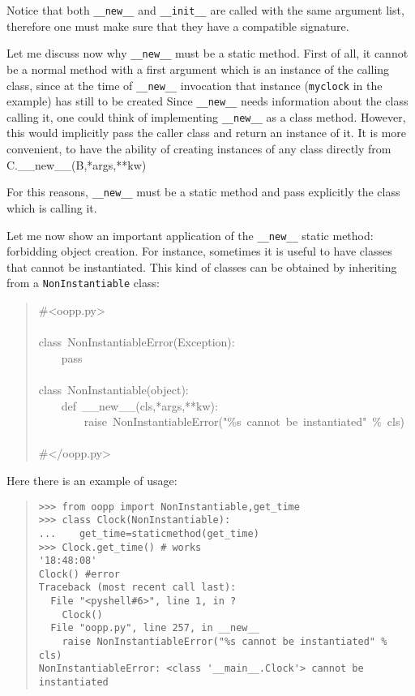 \documentclass[10pt,english]{article}
\begin{document}
Notice that both \texttt{{\_}{\_}new{\_}{\_}} and \texttt{{\_}{\_}init{\_}{\_}} are called with the same 
argument list, therefore one must make sure that they have a compatible 
signature.

Let me discuss now why \texttt{{\_}{\_}new{\_}{\_}} must be a static method.
First of all, it cannot be a normal method with a first argument which is an
instance of the calling class, since at the time of \texttt{{\_}{\_}new{\_}{\_}} invocation
that instance (\texttt{myclock} in the example) has still to be created
Since \texttt{{\_}{\_}new{\_}{\_}} needs information about the class calling it, one
could think of implementing \texttt{{\_}{\_}new{\_}{\_}} as a class method. However,
this would implicitly pass the caller class and return an instance
of it. It is more convenient, to have the ability of creating
instances of any class directly from C.{\_}{\_}new{\_}{\_}(B,*args,**kw)

For this reasons, \texttt{{\_}{\_}new{\_}{\_}} must be a static method and pass explicitly
the class which is calling it.

Let me now show an important application of the \texttt{{\_}{\_}new{\_}{\_}} static method:
forbidding object creation. For instance, sometimes it is useful to have 
classes that cannot be instantiated. This kind of classes can be
obtained by inheriting from a \texttt{NonInstantiable} class:
\begin{quote}
\begin{ttfamily}\begin{flushleft}
\mbox{{\#}<oopp.py>}\\
\mbox{}\\
\mbox{class~NonInstantiableError(Exception):~}\\
\mbox{~~~~pass}\\
\mbox{}\\
\mbox{class~NonInstantiable(object):~}\\
\mbox{~~~~def~{\_}{\_}new{\_}{\_}(cls,*args,**kw):}\\
\mbox{~~~~~~~~raise~NonInstantiableError("{\%}s~cannot~be~instantiated"~{\%}~cls)}\\
\mbox{}\\
\mbox{{\#}</oopp.py>}
\end{flushleft}\end{ttfamily}
\end{quote}

Here there is an example of usage:
\begin{quote}
\begin{verbatim}>>> from oopp import NonInstantiable,get_time
>>> class Clock(NonInstantiable): 
...    get_time=staticmethod(get_time)
>>> Clock.get_time() # works
'18:48:08'
Clock() #error
Traceback (most recent call last):
  File "<pyshell#6>", line 1, in ?
    Clock()
  File "oopp.py", line 257, in __new__
    raise NonInstantiableError("%s cannot be instantiated" % cls)
NonInstantiableError: <class '__main__.Clock'> cannot be instantiated\end{verbatim}
\end{quote}
\end{document}
